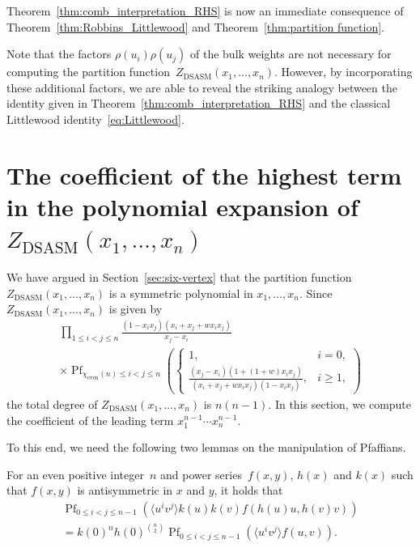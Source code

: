 \documentclass[ALCO, Unicode]{cedram}
\DeclareMathOperator{\DSASM}{DSASM}
\DeclareMathOperator*{\pf}{Pf}
\begin{document}
	Theorem~\ref{thm:comb_interpretation_RHS} is now an immediate consequence of Theorem~\ref{thm:Robbins_Littlewood} and Theorem~\ref{thm:partition function}.
	
	Note that the factors $\rho(u_i) \rho(u_j)$ of the bulk weights are not necessary for computing the partition function~$Z_{\DSASM} (x_1,\dots,x_n)$. However, by incorporating these additional factors, we are able to reveal the striking analogy between the identity given in Theorem~\ref{thm:comb_interpretation_RHS} and the classical Littlewood identity~\eqref{eq:Littlewood}.
	
	\section{\texorpdfstring{The coefficient of the highest term in the polynomial expansion of $Z_{\DSASM} (x_1,\dots,x_n)$}{The coefficient of the highest term in the polynomial expansion of the partition function}}
	\label{sec:highest_term}
	
	We have argued in Section~\ref{sec:six-vertex} that the partition function $Z_{\DSASM} (x_1,\dots,x_n)$ is a symmetric polynomial in $x_1,\dots,x_n$. Since $Z_{\DSASM} (x_1,\dots,x_n)$ is given by
	\begin{multline*}
		\prod_{1 \le i < j \le n} \frac{(1-x_i x_j)(x_i+x_j+w x_i x_j)}{x_j-x_i}\\
		\times
		\pf_{\chi_{\mathrm{even}}(n) \le i < j \le n} \left(
		\begin{cases}
			1, & i=0,\\
			\frac{(x_j-x_i)(1+(1+w) x_i x_j)}{(x_i+x_j+w x_i x_j)(1-x_i x_j)},& i\ge 1,
		\end{cases} \right)
	\end{multline*}
	the total degree of $Z_{\DSASM} (x_1,\dots,x_n)$ is $n(n-1)$. In this section, we compute the coefficient of the leading term $x_1^{n-1} \cdots x_n^{n-1}$.
	
	To this end, we need the following two lemmas on the manipulation of Pfaffians.
	
	\begin{lem}\label{thm:pfaffian_transform}
		For an even positive integer~$n$ and power series~$f(x,y)$, $h(x)$ and $k(x)$ such that $f(x,y)$ is antisymmetric in $x$ and $y$, it holds that
		\begin{multline*}
			\pf_{0 \le i < j \le n-1} \left( \langle u^i v^j \rangle k(u) k(v) f(h(u)u, h(v)v) \right)\\
			= k(0)^n h(0)^{\binom{n}{2}} \pf_{0 \le i < j \le n-1} \left( \langle u^i v^j \rangle f(u,v) \right).
		\end{multline*}
	\end{lem}
	
\end{document}

